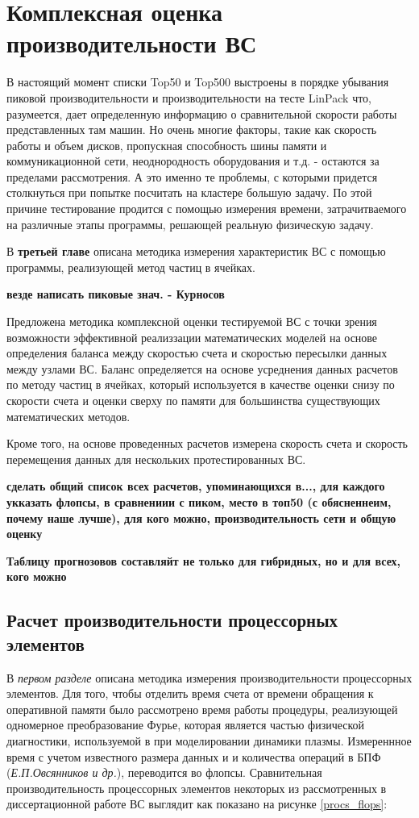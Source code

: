 \chapter{Комплексная оценка производительности ВС}

В настоящий момент списки Top50 и Top500
выстроены в порядке убывания пиковой производительности и производительности на тесте LinPack что, разумеется, дает определенную информацию
о сравнительной скорости работы представленных там машин. Но очень многие факторы, такие как скорость работы и объем дисков, пропускная 
способность шины памяти и коммуникационной сети, неоднородность оборудования и т.д. - остаются за пределами рассмотрения. А это именно те 
проблемы, с которыми придется столкнуться при попытке посчитать на кластере большую задачу. По этой причине тестирование продится с помощью измерения времени, затрачитваемого на различные этапы программы, решающей реальную физическую задачу.

В \textbf{третьей главе} описана методика измерения характеристик ВС с помощью программы, реализующей метод частиц в ячейках.


\textbf{везде написать пиковые знач. - Курносов 
}


Предложена методика комплексной оценки тестируемой ВС с точки зрения возможности эффективной реализзации математических моделей на основе определения баланса между скоростью счета и скоростью пересылки данных между узлами ВС. Баланс определяется на основе усреднения данных расчетов по методу частиц в ячейках, который используется в качестве оценки снизу по скорости счета и оценки сверху по памяти для большинства существующих математических методов.

Кроме того, на основе проведенных расчетов измерена скорость счета и скорость перемещения данных для нескольких протестированных ВС.   

		
\textbf{сделать общий список всех расчетов, упоминающихся в..., для каждого укказать флопсы, в сравнениии с пиком, место в топ50 (с обясненнеим, почему наше лучше), для кого можно, производительность сети и общую оценку}

\textbf{Таблицу прогнозовов составляйт не только для гибридных, но и для всех, кого можно}



\section{Расчет производительности процессорных элементов}
\label{calc_PE}
В \textit{первом разделе} описана методика измерения производительности процессорных элементов.
Для того, чтобы отделить время счета от времени обращения к оперативной памяти было рассмотрено время работы процедуры,
реализующей одномерное преобразование Фурье, которая является частью физической диагностики, используемой в при моделировании динамики плазмы. Измереннное время с учетом известного размера данных и и количества операций в БПФ (\textit{Е.П.Овсянников и др.}), переводится во флопсы. Сравнительная производительность процессорных элементов некоторых из рассмотренных в диссертационной работе ВС выглядит как показано на рисунке  \ref{procs_flops}:

